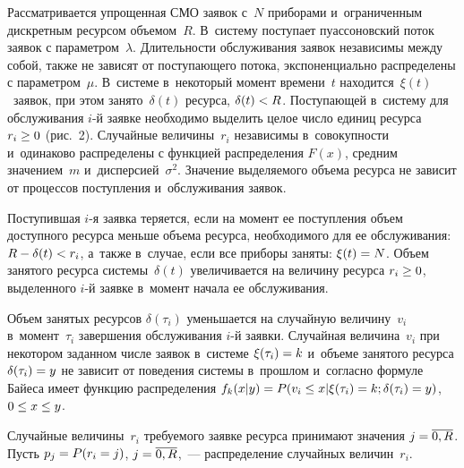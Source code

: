 \begin{multicols}{2}
  Рассматривается упрощенная СМО заявок с~$N$ 
приборами и~ограниченным дискретным ресурсом объемом~$R$. В~систему 
поступает пуассоновский поток заявок с параметром~$\lambda$. Длительности 
обслуживания заявок независимы между собой, также не зависят от 
поступающего потока, экспоненциально распределены с параметром~$\mu$. 
В~системе в~некоторый момент времени~$t$ находится~$\xi(t)$~заявок, при 
этом занято~$\delta(t)$ ресурса, $\delta(t)\hm<R$. Поступающей в~систему для 
обслуживания $i$-й заявке необходимо выделить целое число единиц ресурса 
$r_i\hm\geq 0$ (рис.~2). Случайные величины~$r_i$ независимы 
в~совокупности и~одинаково распределены с функцией распределения $F(x)$, 
средним значением~$m$ и~дисперсией~$\sigma^2$. Значение выделяемого 
объема ресурса не зависит от процессов поступления и~обслуживания заявок. 
  
  Поступившая $i$-я заявка теряется, если на момент ее поступления объем 
доступного ресурса меньше объема ресурса, необходимого для ее 
обслуживания: $R\hm- \delta(t)\hm< r_i$, а~также в~случае, если все приборы 
заняты: $\xi(t)\hm=N$. Объем занятого ресурса системы~$\delta(t)$ 
увеличивается на величину ресурса $r_i\hm\geq 0$, выделенного $i$-й заявке 
в~момент начала ее обслуживания.
  
  Объем занятых ресурсов $\delta(\tau_i)$ уменьшается на случайную 
величину~$v_i$ в~момент~$\tau_i$ завершения обслуживания $i$-й заявки. 
Случайная величина~$v_i$ при некотором заданном числе заявок в~системе 
$\xi(\tau_i)\hm= k$ и~объеме занятого ресурса $\delta(\tau_i)\hm=y$ не зависит 
от поведения системы в~прошлом и~согласно формуле Байеса имеет функцию 
распределения $f_k(x\vert y) \hm= P(v_i\leq x\vert \xi(\tau_i)\hm= k; 
\delta(\tau_i)\hm=y)$, $0\hm\leq x\hm\leq y$. 
  
  Случайные величины~$r_i$ требуемого заявке ресурса принимают значения 
$j\hm= \overline{0,R}$. Пусть $p_j\hm= P(r_i=j)$, $j\hm= \overline{0,R}$,~--- 
распределение случайных величин~$r_i$.
  
  
  \begin{figure*} %
             \vspace*{1pt}
 \begin{center}
 \mbox{%
 \epsfxsize=163.663mm
 }
 \end{center}
 \vspace*{-11pt}
  \end{figure*}
  

\end{multicols}
